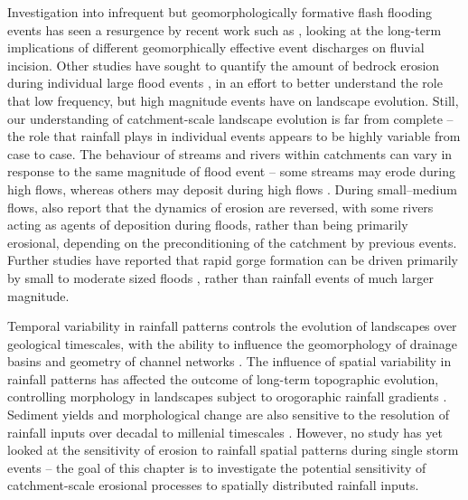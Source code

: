 Investigation into infrequent but geomorphologically formative flash flooding events has seen a resurgence by recent work such as \citet{Huang2006}, looking at the long-term implications of different geomorphically effective event discharges on fluvial incision. Other studies have sought to quantify the amount of bedrock erosion during individual large flood events \citep[e.g.][]{gupta2007catastrophic,lamb2010rapid,baynes2015erosion}, in an effort to better understand the role that low frequency, but high magnitude events have on landscape evolution. Still, our understanding of catchment-scale landscape evolution is far from complete -- the role that rainfall plays in individual events appears to be highly variable from case to case. The behaviour of streams and rivers within catchments can vary in response to the same magnitude of flood event -- some streams may erode during high flows, whereas others may deposit during high flows \citep{turowski2013large}. During small--medium flows, \citet{turowski2013large} also report that the dynamics of erosion are reversed, with some rivers acting as agents of deposition during floods, rather than being primarily erosional, depending on the preconditioning of the catchment by previous events. Further studies have reported that rapid gorge formation can be driven primarily by small to moderate sized floods \citep{anton2015exceptional}, rather than rainfall events of much larger magnitude.

Temporal variability in rainfall patterns controls the evolution of landscapes over geological timescales, with the ability to influence the geomorphology of drainage basins and geometry of channel networks \citep{Tucker2000,Solyom2004}. The influence of spatial variability in rainfall patterns has affected the outcome of long-term topographic evolution, controlling morphology in landscapes subject to orogoraphic rainfall gradients \citep{solyom2007importance,han2014modeling,han2015measuring}. Sediment yields and morphological change are also sensitive to the resolution of rainfall inputs over decadal to millenial timescales \citep{coulthard2016sensitivity}. However, no study has yet looked at the sensitivity of erosion to rainfall spatial patterns during single storm events -- the goal of this chapter is to investigate the potential sensitivity of catchment-scale erosional processes to spatially distributed rainfall inputs.

%

